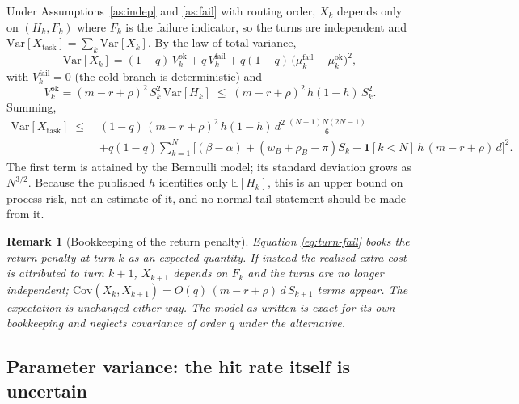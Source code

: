\documentclass[11pt]{article}
\newtheorem{remark}{Remark}
\newcommand{\E}{\mathbb{E}}
\newcommand{\Var}{\mathrm{Var}}
\newcommand{\Cov}{\mathrm{Cov}}
\newcommand{\ind}{\mathbf{1}}
\begin{document}
Under Assumptions~\ref{as:indep} and \ref{as:fail} with routing \textsf{order},
$X_k$ depends only on $(H_k, F_k)$ where $F_k$ is the failure indicator, so the
turns are independent and $\Var[X_{\text{task}}] = \sum_k \Var[X_k]$. By the law
of total variance,
\begin{equation}\label{eq:var-turn}
  \Var[X_k] = (1-q)\, V_k^{\text{ok}} + q\, V_k^{\text{fail}}
  + q(1-q)\,\big(\mu_k^{\text{fail}} - \mu_k^{\text{ok}}\big)^2,
\end{equation}
with $V_k^{\text{fail}} = 0$ (the cold branch is deterministic) and
\begin{equation}\label{eq:var-ok}
  V_k^{\text{ok}} = (m-r+\rho)^2\, S_k^2\, \Var[H_k] \;\le\; (m-r+\rho)^2\, h(1-h)\, S_k^2 .
\end{equation}
Summing,
\begin{equation}\label{eq:var}
\begin{split}
  \Var[X_{\text{task}}]
  \;\le\;& (1-q)\,(m-r+\rho)^2\, h(1-h)\, d^2\, \frac{(N-1)N(2N-1)}{6} \\
  &+ q(1-q) \sum_{k=1}^{N} \big[(\beta - \alpha) + (w_B + \rho_B - \pi) S_k + \ind[k<N]\,h\,(m-r+\rho)\,d\big]^2 .
\end{split}
\end{equation}
The first term is attained by the Bernoulli model; its standard deviation grows
as $N^{3/2}$. Because the published $h$ identifies only $\E[H_k]$, this is an
upper bound on process risk, not an estimate of it, and no normal-tail
statement should be made from it.

\begin{remark}[Bookkeeping of the return penalty]
Equation \eqref{eq:turn-fail} books the return penalty at turn $k$ as an
expected quantity. If instead the realised extra cost is attributed to turn
$k+1$, $X_{k+1}$ depends on $F_k$ and the turns are no longer independent;
$\Cov(X_k, X_{k+1}) = O(q)\,(m-r+\rho)\,d\,S_{k+1}$ terms appear. The expectation is
unchanged either way. The model as written is exact for its own bookkeeping and
neglects covariance of order $q$ under the alternative.
\end{remark}

\subsection{Parameter variance: the hit rate itself is uncertain}\label{sec:param}
\end{document}
